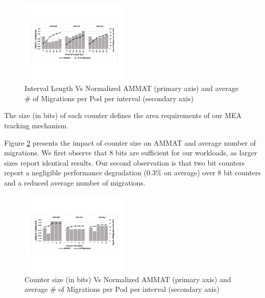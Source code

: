 \begin{figure}[h]
  \includegraphics[width=0.46\textwidth]{figures/interval_length_normalized.pdf}
  \caption{Interval Length Vs Normalized AMMAT (primary axis) and average \# of Migrations per Pod per interval (secondary axis)}
  \label{fig:interval}
\end{figure}

The size (in bits) of each counter defines the area requirements of our MEA tracking mechanism.  

Figure \ref{fig:counter_size} presents the impact of counter size on AMMAT and average number of migrations. We first observe that 8 bits are sufficient for our workloads, as larger sizes report identical results. Our second observation is that two bit counters report a negligible performance degradation (0.3\% on average) over 8 bit counters and a reduced average number of migrations.

\begin{figure}[h]
  \includegraphics[width=0.46\textwidth]{figures/counter_size_normalized.pdf}
  \caption{Counter size (in bits) Vs Normalized AMMAT (primary axis) and average \# of Migrations per Pod per interval (secondary axis)}
  \label{fig:counter_size}
\end{figure}

